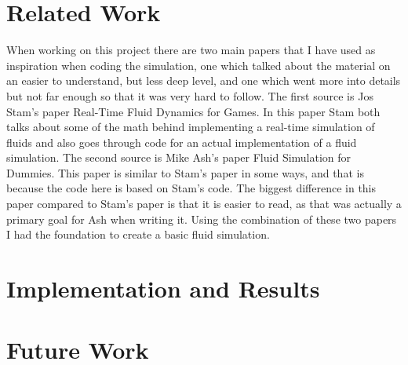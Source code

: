 \documentclass{article}
\begin{document}
\begin{multicols}{2}
\section{Related Work}
When working on this project there are two main papers that I have used as inspiration when coding the simulation, one which talked about the material on an easier to understand, but less deep level, and one which went more into details but not far enough so that it was very hard to follow. The first source is Jos Stam's paper Real-Time Fluid Dynamics for Games. In this paper Stam both talks about some of the math behind implementing a real-time simulation of fluids and also goes through code for an actual implementation of a fluid simulation. The second source is Mike Ash's paper Fluid Simulation for Dummies. This paper is similar to Stam's paper in some ways, and that is because the code here is based on Stam's code. The biggest difference in this paper compared to Stam's paper is that it is easier to read, as that was actually a primary goal for Ash when writing it. Using the combination of these two papers I had the foundation to create a basic fluid simulation.

\section{Implementation and Results}
\section{Future Work}


\end{multicols}
\end{document}
